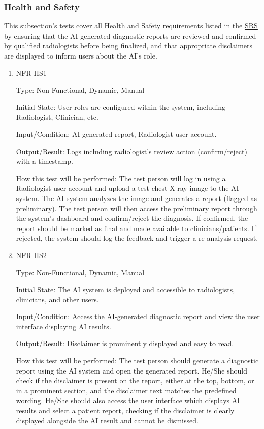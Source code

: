 \documentclass[12pt, titlepage]{article}
\begin{document}
\begin{enumerate}
\begin{enumerate}
\end{enumerate}

\subsubsection{Health and Safety}

This subsection's tests cover all Health and Safety requirements listed in the \href{https://github.com/RezaJodeiri/CXR-Capstone/blob/main/docs/SRS/SRS.pdf}{SRS} \citep{SRS}
 by ensuring that the AI-generated diagnostic reports are reviewed and confirmed by qualified radiologists before being finalized, and that appropriate disclaimers are displayed to inform users about the AI's role.

\begin{enumerate}

\item{NFR-HS1}\label{NFR-HS1}

Type: Non-Functional, Dynamic, Manual

Initial State: User roles are configured within the system, including Radiologist, Clinician, etc.

Input/Condition: AI-generated report, Radiologist user account.

Output/Result: Logs including radiologist's review action (confirm/reject) with a timestamp.

How this test will be performed: The test person will log in using a Radiologist user account and upload a test chest X-ray image to the AI system. The AI system analyzes the image and generates a report (flagged as preliminary). The test person will then access the preliminary report through the system's dashboard and confirm/reject the diagnosis. If confirmed, the report should be marked as final and made available to clinicians/patients. If rejected, the system should log the feedback and trigger a re-analysis request.

\item{NFR-HS2}\label{NFR-HS2}

Type: Non-Functional, Dynamic, Manual

Initial State: The AI system is deployed and accessible to radiologists, clinicians, and other users.

Input/Condition: Access the AI-generated diagnostic report and view the user interface displaying AI results.

Output/Result: Disclaimer is prominently displayed and easy to read.

How this test will be performed: The test person should generate a diagnostic report using the AI system and open the generated report. He/She should check if the disclaimer is present on the report, either at the top, bottom, or in a prominent section, and the disclaimer text matches the predefined wording. He/She should also access the user interface which displays AI results and select a patient report, checking if the disclaimer is clearly displayed alongside the AI result and cannot be dismissed.


\end{enumerate}
\end{enumerate}
\end{document}
